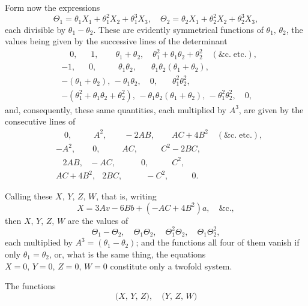 \documentclass[11pt]{article}
\begin{document}
\noindent
Form now the expressions
\[
\Theta_1 = \theta_1 X_1 + \theta_1^2 X_2 + \theta_1^3 X_3,\quad \Theta_2 = \theta_2 X_1 + \theta_2^2 X_2 + \theta_2^3 X_3,
\]
each divisible by $\theta_1 - \theta_2$. These are evidently symmetrical functions of $\theta_1,\,\theta_2$, the
values being given by the successive lines of the determinant
\begin{align*}
&\quad 0,\quad\;\; 1,\qquad \theta_1+\theta_2,\quad \theta_1^2 + \theta_1\theta_2 + \theta_2^2 \quad (\&\mathrm{c.}\;\text{etc.}),\\
&-1,\quad\;\; 0,\qquad\;\; \theta_1\theta_2,\quad\;\;\, \theta_1\theta_2(\theta_1+\theta_2),\\
&-(\theta_1+\theta_2),\,-\theta_1\theta_2,\quad 0,\quad\;\;\, \theta_1^2\theta_2^2,\\
&-(\theta_1^2+\theta_1\theta_2+\theta_2^2),\,-\theta_1\theta_2(\theta_1+\theta_2),\,-\theta_1^2\theta_2^2,\quad 0,
\end{align*}
and, consequently, these same quantities, each multiplied by $A^3$, are given by the
consecutive lines of
\begin{align*}
&\quad 0,\qquad\;\; A^2,\qquad -2AB,\qquad AC + 4B^2 \quad (\&\mathrm{c.}\;\text{etc.}),\\
&-A^2,\qquad 0,\qquad\;\; AC,\qquad\;\;\, C^2 - 2BC,\\
&\;\;\; 2AB,\;\;\, -AC,\qquad\quad 0,\qquad\;\;\, C^2,\\
&AC + 4B^2,\;\;\, 2BC,\qquad\;\;\, -C^2,\qquad\;\;\, 0.
\end{align*}

\medskip

\noindent
Calling these $X,\,Y,\,Z,\,W$, that is, writing
\[
X = 3Av - 6Bb + (-AC + 4B^2)a,\quad \&\mathrm{c.},
\]
then $X,\,Y,\,Z,\,W$ are the values of
\[
\Theta_1 - \Theta_2,\quad \Theta_1\Theta_2,\quad \Theta_1^2\Theta_2,\quad \Theta_1\Theta_2^2,
\]
each multiplied by $A^3 = (\theta_1 - \theta_2)$; and the functions all four of them vanish if only
$\theta_1 = \theta_2$, or, what is the same thing, the equations $X = 0,\, Y = 0,\, Z = 0,\, W = 0$
constitute only a twofold system.

\medskip

\noindent
The functions
\[
\bigl(X,\,Y,\,Z\bigr),\quad \bigl(Y,\,Z,\,W\bigr)
\]
\end{document}
